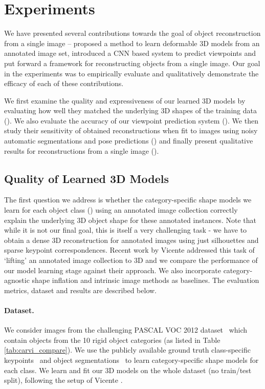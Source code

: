 % 
\section{Experiments}

We have presented several contributions towards the goal of object reconstruction from a single image --  proposed a method to learn deformable 3D models from an annotated image set,  introduced a CNN based system to predict viewpoints and  put forward a framework for reconstructing objects from a single image. Our goal in the experiments was to empirically evaluate and qualitatively demonstrate the efficacy of each of these contributions.

We first  examine the quality and expressiveness of our learned 3D models by evaluating how well they matched the underlying 3D shapes of the training data (). We also evaluate the accuracy of our viewpoint prediction system (). We then study their sensitivity of obtained reconstructions when fit to images using noisy automatic segmentations and pose predictions () and finally present qualitative results for reconstructions from a single image ().


\subsection{Quality of Learned 3D Models}
The first question we address is whether the category-specific shape models we learn for each object class () using an annotated image collection correctly explain the underlying 3D object shape for these annotated instances. Note that while it is not our final goal, this is itself a very challenging task - we have to obtain a dense 3D reconstruction for annotated images using just silhouettes and sparse keypoint correspondences. Recent work by Vicente \etal \cite{carvi14} addressed this task of `lifting' an annotated image collection to 3D and we compare the performance of our model learning stage against their approach. We also incorporate category-agnostic shape inflation  \cite{twarog2012playing} and intrinsic image \cite{Barron2012B} methods as baselines. The evaluation metrics, dataset and results are described below.


\paragraph{Dataset.} We consider images from the challenging PASCAL VOC 2012 dataset~\cite{pascal-voc-2012} which contain objects from the 10 rigid object categories (as listed in Table \ref{tab:carvi_compare}). We use the publicly available ground truth class-specific keypoints~\cite{bourdevECCV10} and object segmentations~\cite{BharathICCV2011} to learn category-specific shape models for each class. We learn and fit our 3D models on the whole dataset (no train/test split), following the setup of Vicente \etal \cite{carvi14}.


